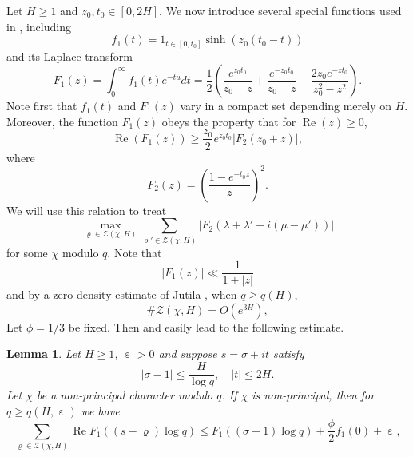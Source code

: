 \documentclass[10pt, reqno]{amsart}
\numberwithin{equation}{section}
\newtheorem{lemma}[theorem]{Lemma}
\renewcommand{\Re}{\operatorname{Re}}
\newcommand{\bb}[1]{\left(#1\right)}
\renewcommand{\epsilon }{\operatorname{\varepsilon}}
\renewcommand{\rho }{\operatorname{\varrho}}
\begin{document}
Let $H\geq 1$ and $z_0,t_0\in [0,2H]$. We now introduce several special functions used in \cite{Heath-Brown}, including 
\begin{equation}\label{eq:f1}
f_1(t)=1_{t \in [0,t_0]} \sinh(z_0 (t_0-t))
\end{equation}
and its Laplace transform
\begin{equation}\label{eq:F1}
F_1(z)=\int_{0}^{\infty}f_1(t)e^{-tu}dt=\frac{1}{2}\bb{\frac{e^{z_0t_0}}{z_0+z}+\frac{e^{-z_0t_0}}{z_0-z}-\frac{2z_0e^{-zt_0}}{z_0^2-z^2}}.
\end{equation}
Note first that $f_1(t)$ and $F_1(z)$ vary in a compact set depending merely on $H$. Moreover, the function $F_1(z)$ obeys the property that for $\Re(z)\geq 0$,
\begin{equation}\label{eq:F1Property}
\Re(F_1(z))\geq \frac{z_0}{2} e^{z_0 t_0}|F_2(z_0+z)|,
\end{equation}
where
\begin{equation}\label{eq:F2}
F_2(z)=\bb{\frac{1-e^{-t_0 z}}{z}}^2.
\end{equation}
We will use this relation to treat
\begin{equation}\label{eq:ToTreat}
\max_{\rho \in \mathcal{Z}(\chi,H)}\sum_{\rho' \in \mathcal{Z}(\chi, H)} |F_2(\lambda+\lambda'-i(\mu-\mu'))|
\end{equation}
for some $\chi$ modulo $q$. Note that
\begin{equation}\label{eq:F1Bound}
|F_1(z)|\ll \frac{1}{1+|z|}
\end{equation}
and by a zero density estimate of Jutila \cite[Theorem 2]{Jut}, when $q\geq q(H)$,
\begin{equation}\label{eq:ZeroDensity}
\# \mathcal{Z}(\chi,H)=O(e^{3H}),
\end{equation}
Let $\phi=1/3$ be fixed. Then \cite[Lemma 5.2]{Heath-Brown} and \cite[Lemma 5.3]{Heath-Brown} easily lead to the following estimate.

\begin{lemma}\label{lem:1}
Let $H\geq 1$, $\epsilon>0$ and suppose $s=\sigma+it$ satisfy
\begin{equation}\label{eq:sCondition}
|\sigma-1| \leq \frac{H}{\log q},\quad |t|\leq 2H.
\end{equation}
Let $\chi$ be a non-principal character modulo $q$. If $\chi$ is non-principal, then for $q\geq q(H,\epsilon)$ we have
\begin{equation}\label{eq:lem1Result}
\sum_{\rho \in \mathcal{Z}(\chi,H)} \Re F_1((s-\rho)\log q)\leq F_1((\sigma-1)\log q)+\frac{\phi}{2}f_1(0)+\epsilon,
\end{equation}
\end{lemma}
\end{document}

